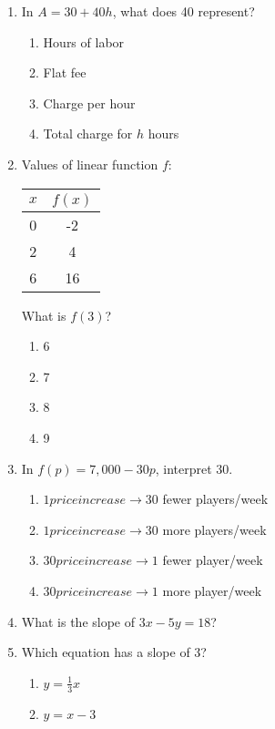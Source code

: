 \documentclass[12pt]{exam}
\begin{document}
\begin{enumerate}
    \item In $A = 30 + 40h$, what does 40 represent?
    \begin{enumerate}[label=\Alph*)]
        \item Hours of labor
        \item Flat fee
        \item Charge per hour
        \item Total charge for $h$ hours
    \end{enumerate}
    \item Values of linear function $f$:
    \begin{center}
        \begin{tabular}{|c|c|}
            \hline
            $x$ & $f(x)$ \\
            \hline
            0 & -2 \\
            2 & 4 \\
            6 & 16 \\
            \hline
        \end{tabular}
    \end{center}
    What is $f(3)$?
    \begin{enumerate}[label=\Alph*)]
        \item 6
        \item 7
        \item 8
        \item 9
    \end{enumerate}
    \item In $f(p) = 7,000 - 30p$, interpret 30.
    \begin{enumerate}[label=\Alph*)]
        \item $1 price increase \to 30$ fewer players/week
        \item $1 price increase \to 30$ more players/week
        \item $30 price increase \to 1$ fewer player/week
        \item $30 price increase \to 1$ more player/week
    \end{enumerate}
    \item What is the slope of $3x - 5y = 18$?
    \item Which equation has a slope of 3?
    \begin{enumerate}[label=\Alph*)]
        \item $y = \frac{1}{3}x$
        \item $y = x - 3$

\end{enumerate}
\end{enumerate}
\end{document}
